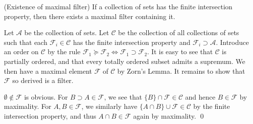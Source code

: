 \documentclass{article}
\begin{document}
\begin{prp}\label{existence maximal filter} (Existence of maximal filter)
    If a collection of sets has the finite intersection property, then there exists a maximal filter containing it.
\end{prp}
\begin{prf}
    Let \( \mathscr{A} \) be the collection of sets.
    Let \( \mathscr{C} \) be the collection of all collections of sets such that each \( \mathscr{F}_i \in \mathscr{C} \) has the finite intersection property and \( \mathscr{F}_i \supset \mathscr{A} \). Introduce an order on \( \mathscr{C} \) by the rule \( \mathscr{F}_1 \succeq \mathscr{F}_2 \iff \mathscr{F}_1 \supset \mathscr{F}_2\).
    It is easy to see that \( \mathscr{C} \) is partially ordered, and that every totally ordered subset admits a supremum. We then have a maximal element \( \mathscr{F} \) of \( \mathscr{C} \) by Zorn's Lemma.
    It remains to show that \( \mathscr{F} \) so derived is a filter.

    \( \emptyset \notin \mathscr{F} \) is obvious.
    For \( B \supset A \in \mathscr{F} \), we see that \( \{B\}\cap \mathscr{F} \in \mathscr{C} \) and hence \( B \in \mathscr{F} \) by maximality.
    For \( A, B \in \mathscr{F} \), we similarly have \( \{A \cap B\} \cup \mathscr{F} \in \mathscr{C} \) by the finite intersection property, and thus \( A \cap B \in \mathscr{F} \) again by maximality.
    \qed\end{prf}

\end{document}
